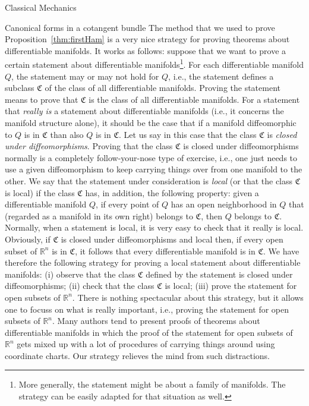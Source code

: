 \documentclass[oneside,a4paper,11pt]{amsbook}
\newcommand{\R}{\mathds R}
\theoremstyle{remark}\newtheorem{exercise}{Exercise}[chapter]
\theoremstyle{plain}\newtheorem{teo}{Theorem}[section]
\theoremstyle{plain}\newtheorem{lem}[teo]{Lemma}
\theoremstyle{plain}\newtheorem{prop}[teo]{Proposition}
\theoremstyle{plain}\newtheorem{cor}[teo]{Corollary}
\theoremstyle{definition}\newtheorem{defin}[teo]{Definition}
\theoremstyle{remark}\newtheorem{rem}[teo]{Remark}
\theoremstyle{definition}\newtheorem{notation}[teo]{Notation}
\theoremstyle{definition}\newtheorem{convention}[teo]{Convention}
\theoremstyle{definition}\newtheorem{example}[teo]{Example}
\numberwithin{section}{chapter}
\numberwithin{equation}{section}
\begin{document}
\begin{chapter}{Classical Mechanics}
\begin{section}{Canonical forms in a cotangent bundle}
The method that we used to prove Proposition~\ref{thm:firstHam} is a very nice strategy for proving theorems about
differentiable manifolds. It works as follows: suppose that we want to prove a certain statement about differentiable manifolds\footnote{%
More generally, the statement might be about a family of manifolds. The strategy can be easily adapted
for that situation as well.}.
For each differentiable manifold $Q$, the statement may or may not hold for $Q$, i.e., the statement
defines a subclass $\mathfrak C$ of the class of all differentiable manifolds. Proving the statement
means to prove that $\mathfrak C$ is the class of all differentiable manifolds.
For a statement that {\em really is\/} a statement about differentiable manifolds (i.e., it concerns the manifold
structure alone), it should be the case that if a manifold diffeomorphic to $Q$ is in $\mathfrak C$ than also $Q$ is in $\mathfrak C$.
Let us say in this case that the class $\mathfrak C$ is {\em closed under diffeomorphisms}.
Proving that the class $\mathfrak C$ is closed under diffeomorphisms normally is a completely follow-your-nose type of
exercise, i.e., one just needs to use a given diffeomorphism to keep carrying things over from one manifold to the other.
We say that the statement under consideration is {\em local\/} (or that the class $\mathfrak C$ is local)
if the class $\mathfrak C$ has, in addition, the following property: given a differentiable manifold $Q$, if every point
of $Q$ has an open neighborhood in $Q$ that (regarded as a manifold in its own right) belongs to $\mathfrak C$, then $Q$ belongs
to $\mathfrak C$. Normally, when a statement is local, it is very easy to check that it really is local.
Obviously, if $\mathfrak C$ is closed under diffeomorphisms and local then, if every open subset of $\R^n$ is in $\mathfrak C$,
it follows that every differentiable manifold is in $\mathfrak C$. We have therefore the following strategy for
proving a local statement about differentiable manifolds: (i) observe that the class $\mathfrak C$ defined by the statement
is closed under diffeomorphisms; (ii) check that the class $\mathfrak C$ is local; (iii) prove the statement for
open subsets of $\R^n$. There is nothing spectacular about this strategy, but it allows one to focuss on what is really
important, i.e., proving the statement for open subsets of $\R^n$. Many authors tend to present proofs of theorems
about differentiable manifolds in which the proof of the statement for open subsets of $\R^n$ gets mixed up with a lot
of procedures of carrying things around using coordinate charts. Our strategy relieves the mind
from such distractions.


\end{section}
\end{chapter}
\end{document}
